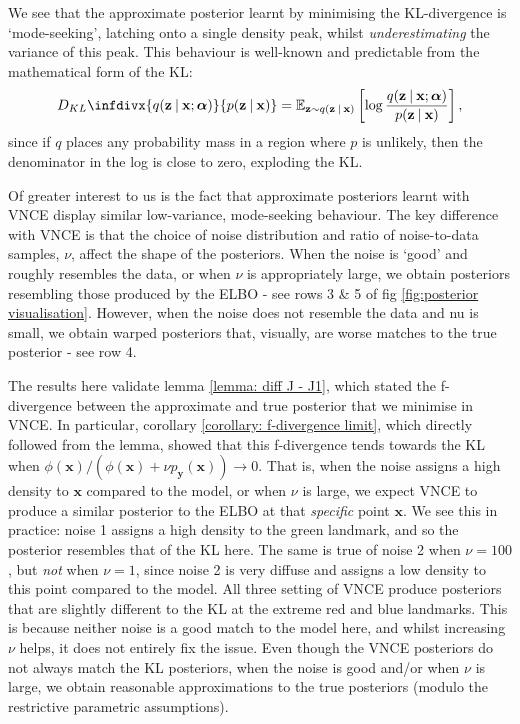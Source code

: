 \documentclass[11pt, oneside]{article}
\newcommand{\alphab}{{\boldsymbol{\alpha}}}
\newcommand{\pnn}{\phi}
\newcommand{\pnoise}{p_{ \mathbf y}}
\newcommand{\q}[1]{q(\z \given{#1})}
\newcommand{\x}{{\mathbf x}}
\newcommand{\z}{{\mathbf z}}
\newcommand{\E}{\mathbb{E}}
\newcommand{\Evar}[1]{\E_{\z \sim \q{#1}}}
\newcommand\given[1][]{\:#1\vert\:}
\newcommand{\infdiv}[1]{D_{#1}\infdivx}
\theoremstyle{definition}
\begin{document}
We see that the approximate posterior learnt by minimising the KL-divergence is `mode-seeking', latching onto a single density peak, whilst \emph{underestimating} the variance of this peak. This behaviour is well-known and predictable from the mathematical form of the KL:
\begin{align}
    \infdiv{KL}{q(\z \given \x ; \alphab)}{p(\z \given\x)} = \Evar{\x} \left[ \log \frac{q(\z \given \x ; \alphab)}{p(\z \given\x)}\right],
\end{align}
since if $q$ places any probability mass in a region where $p$ is unlikely, then the denominator in the log is close to zero, exploding the KL.

Of greater interest to us is the fact that approximate posteriors learnt with VNCE display similar low-variance, mode-seeking behaviour. The key difference with VNCE is that the choice of noise distribution and ratio of noise-to-data samples, $\nu$, affect the shape of the posteriors. When the noise is `good’ and roughly resembles the data, or when $\nu$ is appropriately large, we obtain posteriors resembling those produced by the ELBO - see rows 3 & 5 of fig \ref{fig:posterior visualisation}. However, when the noise does not resemble the data and nu is small, we obtain warped posteriors that, visually, are worse matches to the true posterior - see row 4.

The results here validate lemma \ref{lemma: diff J - J1}, which stated the f-divergence between the approximate and true posterior that we minimise in VNCE. In particular, corollary \ref{corollary: f-divergence limit}, which directly followed from the lemma, showed that this f-divergence tends towards the KL when $\pnn(\x)/(\pnn(\x) + \nu \pnoise(\x)) \rightarrow 0$. That is, when the noise assigns a high density to $\x$ compared to the model, or when $\nu$ is large, we expect VNCE to produce a similar posterior to the ELBO at that \emph{specific} point $\x$. We see this in practice: noise 1 assigns a high density to the green landmark, and so the posterior resembles that of the KL here. The same is true of noise 2 when $\nu=100$, but \emph{not} when $\nu=1$, since noise 2 is very diffuse and assigns a low density to this point compared to the model. All three setting of VNCE produce posteriors that are slightly different to the KL at the extreme red and blue landmarks. This is because neither noise is a good match to the model here, and whilst increasing $\nu$ helps, it does not entirely fix the issue. Even though the VNCE posteriors do not always match the KL posteriors, when the noise is good and/or when $\nu$ is large, we obtain reasonable approximations to the true posteriors (modulo the restrictive parametric assumptions).
\end{document}
